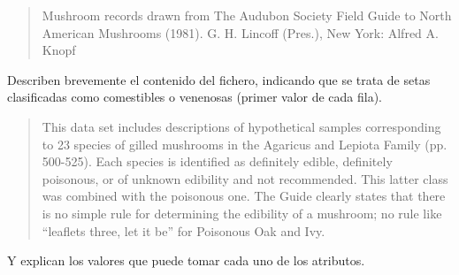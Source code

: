 \begin{quote}
   Mushroom records drawn from The Audubon Society Field Guide to North American Mushrooms (1981). G. H. Lincoff (Pres.), New York: Alfred A. Knopf 
\end{quote}
\noindent Describen brevemente el contenido del fichero, indicando que se trata de setas clasificadas como comestibles o venenosas (primer valor de cada fila).
\begin{quote}
\label{cita:incertidumbre-suprimida-en-mushroom}
   This data set includes descriptions of hypothetical samples corresponding to 23 species of gilled mushrooms in the Agaricus and Lepiota Family (pp. 500-525). Each species is identified as definitely edible, definitely poisonous, or of unknown edibility and not recommended. This latter class was combined with the poisonous one. The Guide clearly states that there is no simple rule for determining the edibility of a mushroom; no rule like ``leaflets three, let it be'' for Poisonous Oak and Ivy.
\end{quote}
\noindent Y explican los valores que puede tomar cada uno de los atributos.
